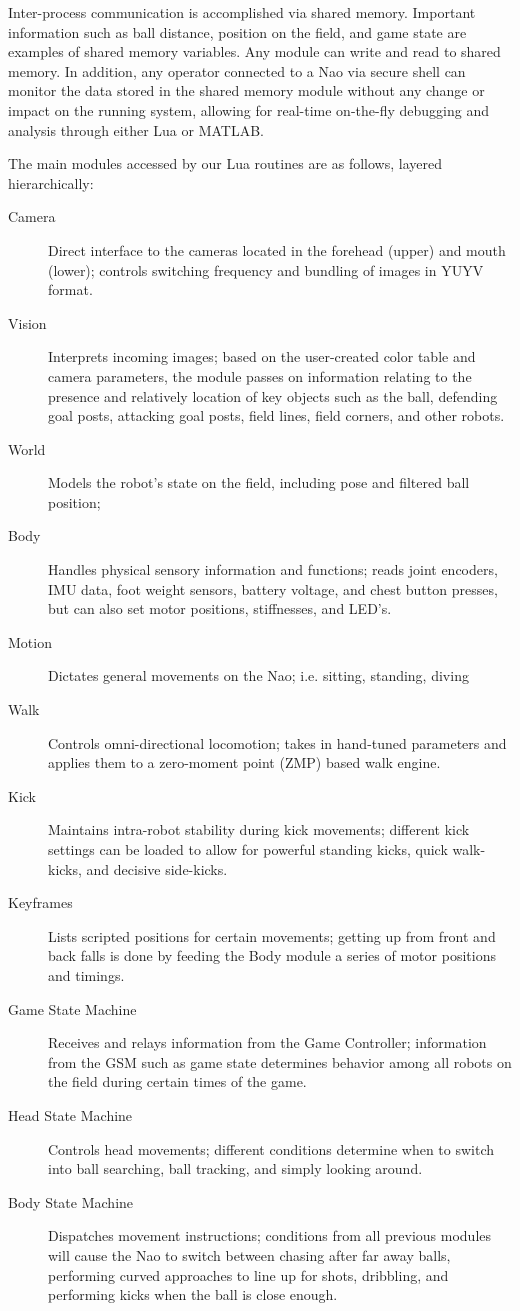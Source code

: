\documentclass{article}
\begin{document}
	Inter-process communication is accomplished via shared memory. Important information such as ball distance, position on the field, and game state are examples of shared memory variables. Any module can write and read to shared memory. In addition, any operator connected to a Nao via secure shell can monitor the data stored in the shared memory module without any change or impact on the running system, allowing for real-time on-the-fly debugging and analysis through either Lua or MATLAB.

	The main modules accessed by our Lua routines are as follows, layered hierarchically:
	\begin{description}
		\item[Camera] Direct interface to the cameras located in the forehead (upper) and mouth (lower); controls switching frequency and bundling of images in YUYV format.
  		\item[Vision] Interprets incoming images; based on the user-created color table and camera parameters, the module passes on information relating to the presence and relatively location of key objects such as the ball, defending goal posts, attacking goal posts, field lines, field corners, and other robots.
	  	\item[World] Models the robot's state on the field, including pose and filtered ball position; 
		\item[Body] Handles physical sensory information and functions; reads joint encoders, IMU data, foot weight sensors, battery voltage, and chest button presses, but can also set motor positions, stiffnesses, and LED's.
  		\item[Motion] Dictates general movements on the Nao; i.e. sitting, standing, diving	
	  	\item[Walk] Controls omni-directional locomotion; takes in hand-tuned parameters and applies them to a zero-moment point (ZMP) based walk engine.
		\item[Kick] Maintains intra-robot stability during kick movements; different kick settings can be loaded to allow for powerful standing kicks, quick walk-kicks, and decisive side-kicks.
  		\item[Keyframes] Lists scripted positions for certain movements; getting up from front and back falls is done by feeding the Body module a series of motor positions and timings.
	  	\item[Game State Machine] Receives and relays information from the Game Controller; information from the GSM such as game state determines behavior among all robots on the field during certain times of the game.
		\item[Head State Machine] Controls head movements; different conditions determine when to switch into ball searching, ball tracking, and simply looking around.
  		\item[Body State Machine] Dispatches movement instructions; conditions from all previous modules will cause the Nao to switch between chasing after far away balls, performing curved approaches to line up for shots, dribbling, and performing kicks when the ball is close enough.
	  \end{description}
\end{document}
